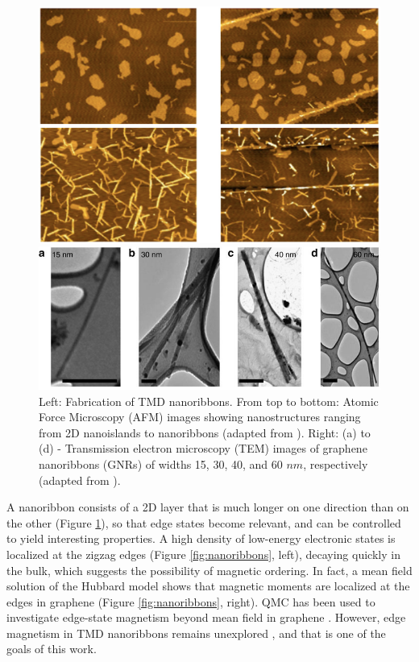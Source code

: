 \documentclass[a0,portrait]{a0poster}
\begin{document}
\begin{multicols}{3}
\begin{figure}
\begin{minipage}[c]{0.2\textwidth}
\centering
\hspace{-6.5cm}\includegraphics[width=0.6\linewidth]{fabrication.png}
\end{minipage} 
\hspace{-6cm}
\begin{minipage}[c]{0.2\textwidth}
\includegraphics[width=0.9\linewidth]{grapheneNanoribbons.jpg}
\end{minipage}
\caption{\small{Left: Fabrication of TMD nanoribbons. From top to bottom: Atomic Force Microscopy (AFM) images showing nanostructures ranging from 2D nanoislands to nanoribbons (adapted from \cite{chen}). Right: (a) to (d) - Transmission electron microscopy (TEM) images of graphene nanoribbons (GNRs) of widths 15, 30, 40, and 60 $nm$, respectively (adapted from \cite{Mohanty2012} )}. \label{fig:fabrication}}
\end{figure}

A nanoribbon consists of a 2D layer that is much longer on one direction than on the other (Figure \ref{fig:fabrication}), so that edge states become relevant, and can be controlled to yield interesting properties. A high density of low-energy electronic states is localized at the  zigzag edges (Figure \ref{fig:nanoribbons}, left), decaying quickly in the bulk, which suggests the possibility of magnetic ordering. In fact, a mean field solution of the Hubbard model shows that magnetic moments are localized at the edges in graphene \cite{yazyev} (Figure \ref{fig:nanoribbons}, right). QMC has been used to investigate edge-state magnetism beyond mean field in graphene \cite{qmc_results1, qmc_results2, qmc_results3, qmc_results4, qmc_results5}.
However, edge magnetism in TMD nanoribbons remains unexplored \cite{nanoribbon}, and that is one of the goals of this work.
 

\end{multicols}
\end{document}
